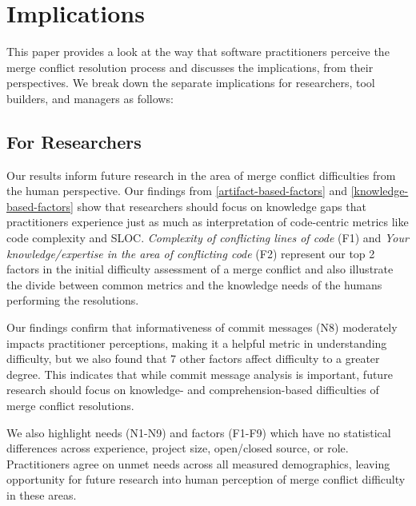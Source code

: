 \section{Implications}\label{implications}

This paper provides a look at the way that software practitioners perceive the merge conflict resolution process and discusses the implications, from their perspectives. We break down the separate implications for researchers, tool builders, and managers as follows:

\subsection{For Researchers}
Our results inform future research in the area of merge conflict difficulties from the human perspective.
Our findings from \ref{artifact-based-factors} and \ref{knowledge-based-factors} show that researchers should focus on knowledge gaps that practitioners experience just as much as interpretation of code-centric metrics like code complexity and SLOC. \textit{Complexity of conflicting lines of code} (F1) and \textit{Your knowledge/expertise in the area of conflicting code} (F2) represent our top 2 factors in the initial difficulty assessment of a merge conflict and also illustrate the divide between common metrics and the knowledge needs of the humans performing the resolutions.
 
Our findings confirm that informativeness of commit messages (N8) moderately impacts practitioner perceptions, making it a helpful metric in understanding difficulty, but we also found that 7 other factors affect difficulty to a greater degree. This indicates that while commit message analysis is important, future research should focus on knowledge- and comprehension-based difficulties of  merge conflict resolutions.

We also highlight needs (N1-N9) and factors (F1-F9) which have no statistical differences across experience, project size, open/closed source, or role. Practitioners agree on unmet needs across all measured demographics, leaving opportunity for future research into human perception of merge conflict difficulty in these areas.

